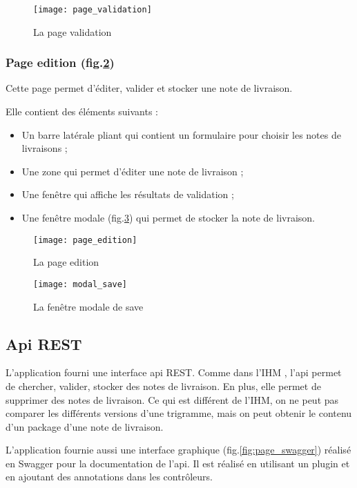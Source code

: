 \begin{figure}[ht]
 \centering
 \texttt{[image: page\_validation]}
 \caption{La page validation}
 \label{fig:page_validation}
\end{figure}

\subsubsection{Page edition (fig.\ref{fig:page_edition})}
Cette page permet d'éditer, valider et stocker une note de livraison.

Elle contient des éléments suivants :
\begin{itemize}
 \item Un barre latérale pliant qui contient un formulaire pour choisir les notes de livraisons ;
 \item Une zone qui permet d'éditer une note de livraison ;
 \item Une fenêtre qui affiche les résultats de validation ;
 \item Une fenêtre modale (fig.\ref{fig:modal_save}) qui permet de stocker la note de livraison.
\end{itemize}

\begin{figure}[ht]
 \centering
 \texttt{[image: page\_edition]}
 \caption{La page edition}
 \label{fig:page_edition}
\end{figure}

\begin{figure}[ht]
 \centering
 \texttt{[image: modal\_save]}
 \caption{La fenêtre modale de save}
 \label{fig:modal_save}
\end{figure}

\subsection{Api REST}
L'application fourni une interface api REST.
Comme dans l'IHM , l'api permet de chercher, valider, stocker des notes de livraison.
En plus, elle permet de supprimer des notes de livraison.
Ce qui est différent de l'IHM, on ne peut pas comparer les différents versions d'une trigramme, mais on peut obtenir le contenu d'un package d'une note de livraison.

L'application fournie aussi une interface graphique (fig.\ref{fig:page_swagger}) réalisé en Swagger pour la documentation de l'api.
Il est réalisé en utilisant un plugin et en ajoutant des annotations dans les contrôleurs.

